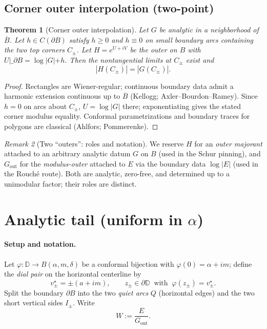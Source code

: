 \documentclass[11pt]{article}
\numberwithin{equation}{section}
\newtheorem{theorem}{Theorem}[section]
\theoremstyle{remark}
\newtheorem{remark}[theorem]{Remark}
\newcommand{\D}{\mathbb{D}}
\newcommand{\Gout}{G_{\mathrm{out}}}
\begin{document}
\subsection{Corner outer interpolation (two-point)}\label{subsec:corner-interp}

\begin{theorem}[Corner outer interpolation]\label{thm:corner-outer}
Let $G$ be analytic in a neighborhood of $\overline B$. Let $h\in C(\partial B)$ satisfy $h\ge 0$ and $h\equiv 0$ on small boundary arcs containing the two top corners $C_\pm$. Let $H=e^{U+iV}$ be the outer on $B$ with $U|\_{\partial B}=\log|G|+h$. Then the nontangential limits at $C_\pm$ exist and
\[
|H(C_\pm)|=|G(C_\pm)|.
\]
\end{theorem}

\begin{proof}
Rectangles are Wiener-regular; continuous boundary data admit a harmonic extension continuous up to $\overline B$ (Kellogg; Axler--Bourdon--Ramey). Since $h=0$ on arcs about $C_\pm$, $U=\log|G|$ there; exponentiating gives the stated corner modulus equality. Conformal parametrizations and boundary traces for polygons are classical (Ahlfors; Pommerenke).
\end{proof}

\begin{remark}[Two “outers”: roles and notation]
We reserve $H$ for an \emph{outer majorant} attached to an arbitrary analytic datum $G$ on $B$ (used in the Schur pinning), and $\Gout$ for the \emph{modulus-outer} attached to $E$ via the boundary data $\log|E|$ (used in the Rouch\'e route). Both are analytic, zero-free, and determined up to a unimodular factor; their roles are distinct.
\end{remark}

\section{Analytic tail (uniform in \texorpdfstring{$\alpha$}{alpha})}\label{sec:tail}

\paragraph{Setup and notation.}
Let $\varphi:\D\to B(\alpha,m,\delta)$ be a conformal bijection with $\varphi(0)=\alpha+im$; define the \emph{dial pair} on the horizontal centerline by
\[
v_\pm^\star=\pm(a+im),\qquad z_\pm\in\partial\D\ \text{ with }\ \varphi(z_\pm)=v_\pm^\star.
\]
Split the boundary $\partial B$ into the two \emph{quiet arcs} $Q$ (horizontal edges) and the two short vertical sides $I_\pm$.
Write
\[
W:=\frac{E}{\Gout}.
\]
\end{document}
